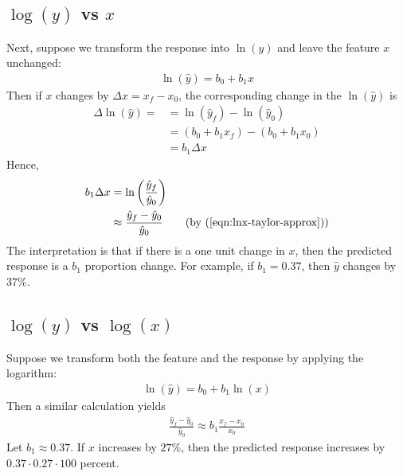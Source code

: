 \documentclass[12pt, a4paper]{article}
\theoremstyle{definition}
\begin{document}
	\subsection*{$\log(\hat{y})$ vs $x$}
	Next, suppose we transform the response into $\ln(y)$ and leave the feature $x$
	unchanged:
	\begin{align*}
		\ln(\hat{y}) = b_0 + b_1x
	\end{align*}
	Then if $x$ changes by $\Delta x = x_f-x_0$, the corresponding change in the $\ln(\hat{y})$
	is
	\begin{align*}
		\Delta \ln(\hat{y})=
		&=\ln(\hat{y}_f) - \ln(\hat{y}_0)\\
		&= (b_0 + b_1x_f) - (b_0 + b_1x_0)\\
		&=b_1\Delta x
	\end{align*}
	Hence,
	\begin{align*}
	b_1\Delta x
	&= \ln\left(\frac{\hat{y}_f}{\hat{y}_0}\right)\\
	&\approx \frac{\hat{y}_f - \hat{y}_0}{\hat{y}_0}
	\tag{by (\ref{eqn:lnx-taylor-approx})}
	\end{align*}
	The interpretation is that if there is a one unit change in $x$, then the predicted
	response is a $b_1$ proportion change. For example, if $b_1=0.37$, then
	$\hat{y}$ changes by $37\%$.
	\subsection*{$\log(y)$ vs $\log(x)$}
	Suppose we transform both the feature and the response by applying the logarithm:
	\begin{align*}
		\ln(\hat{y}) = b_0 + b_1\ln(x)
	\end{align*}
	Then a similar calculation yields
	\begin{align*}
		\frac{\hat{y}_f - \hat{y}_0}{\hat{y}_0} \approx b_1 \frac{x_f - x_0}{x_0}
	\end{align*}
	Let $b_1 \approx 0.37$. If $x$ increases by $27\%$, then the predicted response
	increases by $0.37\cdot 0.27\cdot 100$ percent.
\end{document}
